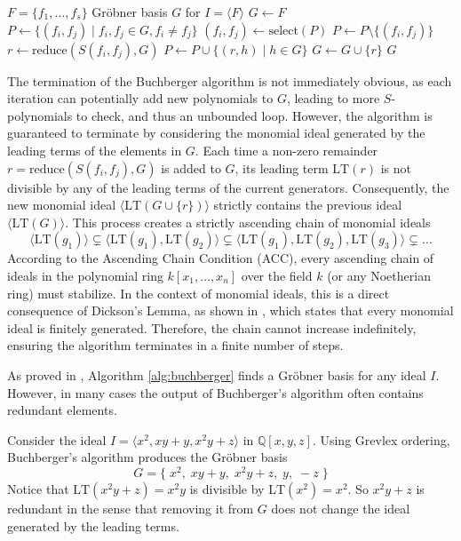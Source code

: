\begin{algorithm}[H]
\caption{Buchberger's Algorithm}
\label{alg:buchberger}
\begin{algorithmic}[1]
\Require $F = \{f_1, \dots, f_s\}$
\Ensure Gröbner basis $G$ for $I = \langle F \rangle$
\State $G \leftarrow F$
\State $P \leftarrow \{(f_i, f_j) \mid f_i, f_j \in G, f_i \neq f_j\}$
    \State $(f_i, f_j) \leftarrow \text{select}(P)$
    \State $P \leftarrow P \setminus \{(f_i, f_j)\}$
    \State $r \leftarrow \text{reduce}(S(f_i, f_j), G)$
        \State $P \leftarrow P \cup \{(r, h) \mid h \in G\}$
        \State $G \leftarrow G \cup \{r\}$
    \EndIf
\EndWhile
\State \Return $G$
\end{algorithmic}
\end{algorithm}

The termination of the Buchberger algorithm is not immediately obvious, as each iteration can potentially add new polynomials to $G$, leading to more $S$-polynomials to check, and thus an unbounded loop. However, the algorithm is guaranteed to terminate by considering the monomial ideal generated by the leading terms of the elements in $G$. Each time a non-zero remainder $r = \text{reduce}(S(f_i, f_j), G)$ is added to $G$, its leading term $\text{LT}(r)$ is not divisible by any of the leading terms of the current generators. Consequently, the new monomial ideal $\langle \text{LT}(G \cup \{r\}) \rangle$ strictly contains the previous ideal $\langle \text{LT}(G) \rangle$. This process creates a strictly ascending chain of monomial ideals
$$
\langle \text{LT}(g_1) \rangle \subsetneq \langle \text{LT}(g_1), \text{LT}(g_2) \rangle \subsetneq \langle \text{LT}(g_1), \text{LT}(g_2), \text{LT}(g_3) \rangle \subsetneq \dots
$$
According to the Ascending Chain Condition (ACC), every ascending chain of ideals in the polynomial ring $k[x_1, \dots, x_n]$ over the field $k$ (or any Noetherian ring) must stabilize. In the context of monomial ideals, this is a direct consequence of Dickson's Lemma, as shown in \cite{cox2015_IVA}, which states that every monomial ideal is finitely generated. Therefore, the chain cannot increase indefinitely, ensuring the algorithm terminates in a finite number of steps. 

As proved in \cite{cox2015_IVA}, Algorithm \ref{alg:buchberger} finds a Gröbner basis for any ideal $I$. However, in many cases the output of Buchberger's algorithm often contains redundant elements. 

\begin{example}
\label{ex: redundant_G}
Consider the ideal $I = \langle x^2, xy+y, x^2y+z \rangle$ in $\mathbb{Q}[x,y,z]$. Using Grevlex ordering, Buchberger's algorithm produces the Gröbner basis
$$G = \Bigg\{ \; x^2, \; xy + y ,\; x^2y+z ,\; y ,\; -z \; \Bigg\}$$
Notice that $\text{LT}(x^2y + z) = x^2 y$ is divisible by $\text{LT}(x^2) = x^2$. So $x^2 y + z$ is redundant in the sense that removing it from $G$ does not change the ideal generated by the leading terms.
\end{example}

